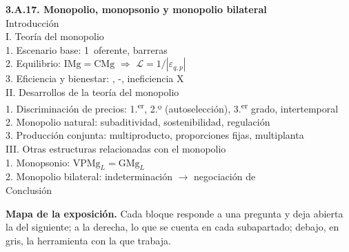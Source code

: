 \documentclass[11pt]{article}
\begin{document}
\begin{esquema}
\textbf{3.A.17. Monopolio, monopsonio y monopolio bilateral}\\[2pt]
Introducción\\
I. Teoría del monopolio\\
\hspace*{1.5em}1. Escenario base: 1~oferente, barreras\\
\hspace*{1.5em}2. Equilibrio: $\mathrm{IMg}=\mathrm{CMg}$ $\Rightarrow$ $\mathcal{L}=1/|\varepsilon_{q,p}|$\\
\hspace*{1.5em}3. Eficiencia y bienestar: , -, ineficiencia X\\
II. Desarrollos de la teoría del monopolio\\
\hspace*{1.5em}1. Discriminación de precios: 1.\textsuperscript{er}, 2.º (autoselección), 3.\textsuperscript{er} grado, intertemporal\\
\hspace*{1.5em}2. Monopolio natural: subaditividad, sostenibilidad, regulación\\
\hspace*{1.5em}3. Producción conjunta: multiproducto, proporciones fijas, multiplanta\\
III. Otras estructuras relacionadas con el monopolio\\
\hspace*{1.5em}1. Monopsonio: $\mathrm{VPMg}_L=\mathrm{GMg}_L$\\
\hspace*{1.5em}2. Monopolio bilateral: indeterminación $\rightarrow$ negociación de \\
Conclusión
\end{esquema}

\begin{anotaciones}
\textbf{Mapa de la exposición.} Cada bloque responde a una pregunta y deja abierta la del siguiente; a la derecha, lo que se cuenta en cada subapartado; debajo, en gris, la herramienta con la que trabaja.
\begin{infografiacaja}
\caption{Mapa del tema: la pregunta de cada bloque, sus subapartados y el hilo que los une}\label{figu:mapa-tema}
\end{infografiacaja}
\end{anotaciones}
\end{document}
